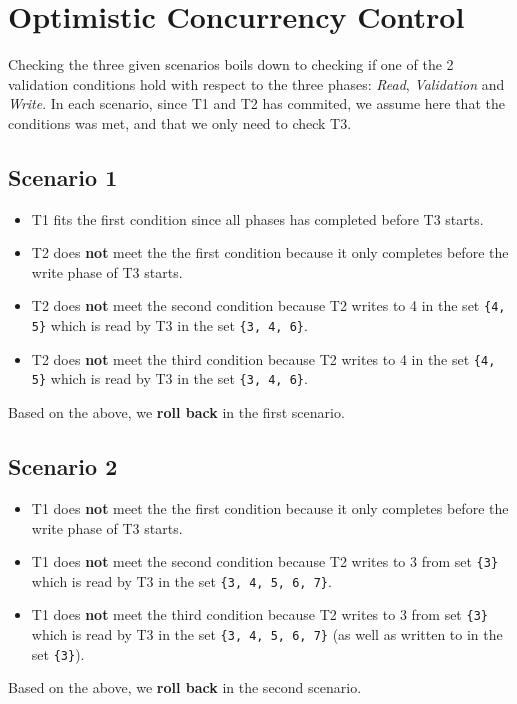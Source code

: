 
\section{Optimistic Concurrency Control}

Checking the three given scenarios boils down to checking if one of the 2 validation conditions hold with respect to the three phases: {\it Read}, {\it Validation} and {\it Write}. In each scenario, since T1 and T2 has commited, we assume here that the conditions was met, and that we only need to check T3.

\subsection{Scenario 1}

\begin{itemize}
\item T1 fits the first condition since all phases has completed before T3 starts.
\item T2 does {\bf not} meet the the first condition because it only completes before the write phase of T3 starts.
\item T2 does {\bf not} meet the second condition because T2 writes to 4 in the set \verb|{4, 5}| which is read by T3 in the set \verb|{3, 4, 6}|.
\item T2 does {\bf not} meet the third condition because T2 writes to 4 in the set \verb|{4, 5}| which is read by T3 in the set \verb|{3, 4, 6}|.
\end{itemize}
Based on the above, we {\bf roll back} in the first scenario.

\subsection{Scenario 2}

\begin{itemize}
\item T1 does {\bf not} meet the the first condition because it only completes before the write phase of T3 starts.
\item T1 does {\bf not} meet the second condition because T2 writes to 3 from set \verb|{3}| which is read by T3 in the set \verb|{3, 4, 5, 6, 7}|.
\item T1 does {\bf not} meet the third condition because T2 writes to 3 from set \verb|{3}| which is read by T3 in the set \verb|{3, 4, 5, 6, 7}| (as well as written to in the set \verb|{3}|).
\end{itemize}
Based on the above, we {\bf roll back} in the second scenario.

